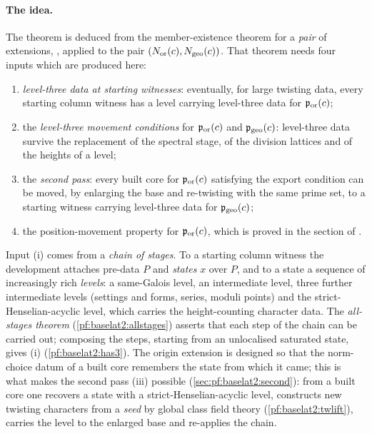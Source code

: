\paragraph{The idea.} The theorem is deduced from the member-existence theorem for a \emph{pair} of
extensions, , applied to the pair
$(N_{\mathrm{or}}(c),N_{\mathrm{geo}}(c))$. That theorem needs four inputs which are produced here:
\begin{enumerate}[label=(\roman*)]
\item \emph{level-three data at starting witnesses}: eventually, for large twisting data, every starting
  column witness has a level carrying level-three data for $\mathfrak{p}_{\mathrm{or}}(c)$;
\item the \emph{level-three movement conditions} for $\mathfrak{p}_{\mathrm{or}}(c)$ and
  $\mathfrak{p}_{\mathrm{geo}}(c)$: level-three data survive the replacement of the spectral stage, of the
  division lattices and of the heights of a level;
\item the \emph{second pass}: every built core for $\mathfrak{p}_{\mathrm{or}}(c)$ satisfying the export
  condition can be moved, by enlarging the base and re-twisting with the same prime set, to a starting
  witness carrying level-three data for $\mathfrak{p}_{\mathrm{geo}}(c)$;
\item the position-movement property for $\mathfrak{p}_{\mathrm{or}}(c)$, which is proved in the section of
  .
\end{enumerate}
Input (i) comes from a \emph{chain of stages}. To a starting column witness the development attaches
pre-data $P$ and \emph{states} $x$ over $P$, and to a state a sequence of increasingly rich
\emph{levels}: a same-Galois level, an intermediate level, three further intermediate levels (settings
and forms, series, moduli points) and the strict-Henselian-acyclic level, which carries the
height-counting character data. The \emph{all-stages theorem} (\cref{pf:baselat2:allstages}) asserts
that each step of the chain can be carried out; composing the steps, starting from an unlocalised
saturated state, gives (i) (\cref{pf:baselat2:has3}). The origin extension is designed so that the
norm-choice datum of a built core remembers the state from which it came; this is what makes the
second pass (iii) possible (\cref{sec:pf:baselat2:second}): from a built core one recovers a state with a
strict-Henselian-acyclic level, constructs new twisting characters from a \emph{seed} by global
class field theory (\cref{pf:baselat2:twlift}), carries the level to the enlarged base and re-applies
the chain.

